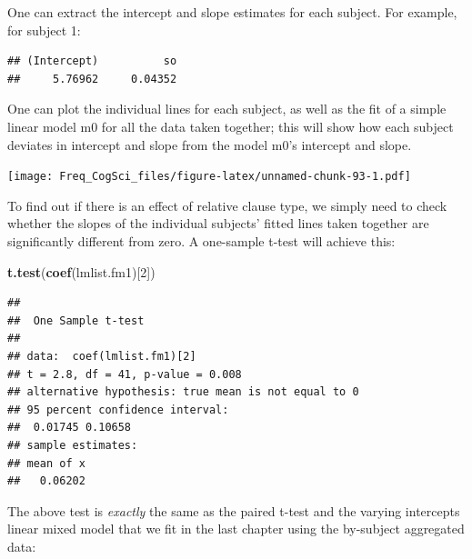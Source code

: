 \documentclass[12pt,]{krantz}
\newenvironment{Shaded}{\begin{snugshade}}{\end{snugshade}}
\newcommand{\DataTypeTok}[1]{\textcolor[rgb]{0.13,0.29,0.53}{#1}}
\newcommand{\DecValTok}[1]{\textcolor[rgb]{0.00,0.00,0.81}{#1}}
\newcommand{\KeywordTok}[1]{\textcolor[rgb]{0.13,0.29,0.53}{\textbf{#1}}}
\newcommand{\NormalTok}[1]{#1}
\newcommand{\OperatorTok}[1]{\textcolor[rgb]{0.81,0.36,0.00}{\textbf{#1}}}
\newcommand{\OtherTok}[1]{\textcolor[rgb]{0.56,0.35,0.01}{#1}}
\newcommand{\StringTok}[1]{\textcolor[rgb]{0.31,0.60,0.02}{#1}}
\begin{document}
One can extract the intercept and slope estimates for each subject. For example, for subject 1:

\begin{Shaded}
\end{Shaded}

\begin{verbatim}
## (Intercept)          so 
##     5.76962     0.04352
\end{verbatim}

One can plot the individual lines for each subject, as well as the fit of a simple linear model m0 for all the data taken together; this will show how each subject deviates in intercept and slope from the model m0's intercept and slope.

\texttt{[image: Freq\_CogSci\_files/figure-latex/unnamed-chunk-93-1.pdf]}

To find out if there is an effect of relative clause type, we simply need to check whether the slopes of the individual subjects' fitted lines taken together are significantly different from zero. A one-sample t-test will achieve this:

\begin{Shaded}
\begin{Highlighting}[]
\KeywordTok{t.test}\NormalTok{(}\KeywordTok{coef}\NormalTok{(lmlist.fm1)[}\DecValTok{2}\NormalTok{])}
\end{Highlighting}
\end{Shaded}

\begin{verbatim}
## 
## 	One Sample t-test
## 
## data:  coef(lmlist.fm1)[2]
## t = 2.8, df = 41, p-value = 0.008
## alternative hypothesis: true mean is not equal to 0
## 95 percent confidence interval:
##  0.01745 0.10658
## sample estimates:
## mean of x 
##   0.06202
\end{verbatim}

The above test is \emph{exactly} the same as the paired t-test and the varying intercepts linear mixed model that we fit in the last chapter using the by-subject aggregated data:

\begin{Shaded}
\end{Shaded}
\end{document}

